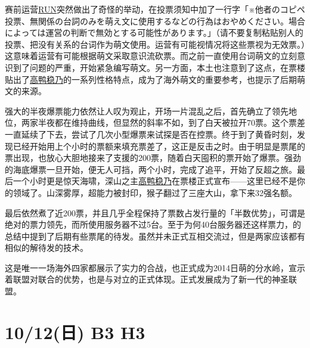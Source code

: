 赛前运营\uline{RUN}突然做出了奇怪的举动，在投票须知中加了一行字「{\mincho ※他者のコピペ投票、無関係の台詞のみを萌え文に使用するなどの行為はおやめください。場合によっては運営の判断で無効とする可能性があります。}」（请不要复制粘贴别人的投票、把没有关系的台词作为萌文使用。运营有可能视情况将这些票视为无效票。）这意味着运营有可能根据萌文采取意识流砍票。而之前一直使用台词萌文的立刻意识到了问题的严重，开始紧急编写萌文。另一方面，本土也注意到了这点，在票楼贴出了\uline{高鸭稳乃}的一系列性格特点，成为了海外萌文的重要参考，也提示了后期萌文的来源。

强大的半夜爆票能力依然让人叹为观止，开场一片混乱之后，首先确立了领先地位，两家半夜都在维持曲线，但显然的斜率不如，到了白天被拉开70票。这个票差一直延续了下去，尝试了几次小型爆票来试探是否在控票。终于到了黄昏时刻，发现已经开始用上个小时的票额来填充票差了，这正是反击之时。由于明显是票尾的票出现，也放心大胆地接来了支援的200票，随着白天囤积的票开始了爆票。强劲的海底爆票一旦开始，便无人可挡，两个小时，完成了追平，开始了反超之旅。最后一个小时更是惊天海啸，深山之主\uline{高鸭稳乃}在票楼正式宣布——这里已经不是你的领域了。山深雾厚，超能力被封印，猴子翻过了三座大山，拿下来32强名额。

最后依然煮了近200票，并且几乎全程保持了票数占发行量的「半数优势」，可谓是绝对的票力领先，而所使用服务器不过5台。至于为何40台服务器还这样票力，的总结中提到了后期有些票尾的待发。虽然并未正式互相交流过，但是两家应该都有相似的解待发的技术。

这是唯一一场海外四家都展示了实力的合战，也正式成为2014日萌的分水岭，宣示着联盟对联合的优势，也是与对立的正式体现。正式发展成为了新一代的神圣联盟。

\section{10/12(日) B3 H3}



